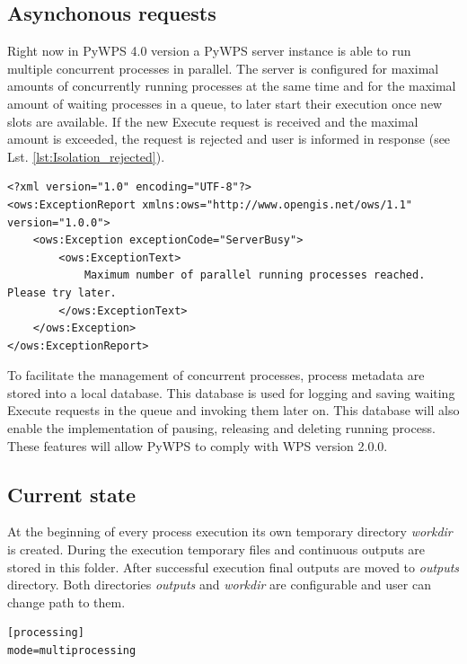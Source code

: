 \documentclass[12pt,a4paper]{article}
\begin{document}
\subsection{Asynchonous requests}
Right now in PyWPS 4.0 version a PyWPS server instance is able to run multiple
concurrent processes in parallel. The server is configured for maximal amounts of concurrently running processes at
the same time and for the maximal amount of waiting processes in a queue, to later start their execution once new
slots are available. If the new Execute request is received and the maximal amount is exceeded, the request is rejected
and user is informed in response (see Lst. \ref{lst:Isolation_rejected}).

\begin{lstlisting}[basicstyle=\small,caption={Resource exceeded exception},label={lst:Isolation_rejected}]
<?xml version="1.0" encoding="UTF-8"?>
<ows:ExceptionReport xmlns:ows="http://www.opengis.net/ows/1.1" version="1.0.0">
    <ows:Exception exceptionCode="ServerBusy">
        <ows:ExceptionText>
            Maximum number of parallel running processes reached. Please try later.
        </ows:ExceptionText>
    </ows:Exception>
</ows:ExceptionReport>
\end{lstlisting}

To facilitate the management of concurrent processes, process metadata are stored into a local database. This database is used
for logging and saving waiting Execute requests in the queue and invoking them later on.
This database will also enable the implementation of pausing, releasing and deleting running process. These features will
allow PyWPS to comply with WPS version 2.0.0.

\subsection{Current state}
\label{subsec:current_state}
At the beginning of every process execution its own temporary directory \textit{workdir} is created. During the execution
temporary files and continuous outputs are stored in this folder. After successful execution final outputs are
moved to \textit{outputs} directory. Both directories \textit{outputs} and \textit{workdir} are configurable and user can
change path to them.

\bigskip
\begin{lstlisting}[basicstyle=\small,caption={pywps.cfg - mode parameter}]
[processing]
mode=multiprocessing
\end{lstlisting}
\end{document}
